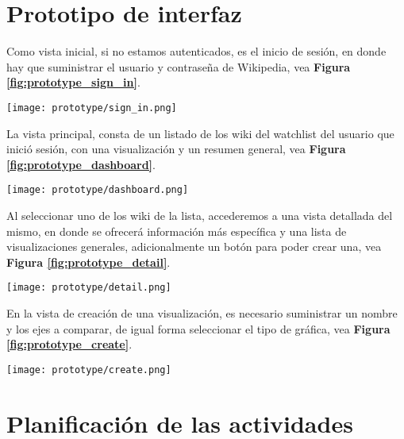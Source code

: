 \section{Prototipo de interfaz}
\bigbreak
Como vista inicial, si no estamos autenticados, es el inicio de sesión, en donde hay que suministrar el usuario y contraseña de Wikipedia, vea \textbf{Figura \ref{fig:prototype_sign_in}}.
\bigbreak
\begin{center}
\texttt{[image: prototype/sign\_in.png]}
\label{fig:prototype_sign_in}
\end{center}
\bigbreak
La vista principal, consta de un listado de los wiki del watchlist del usuario que inició sesión, con una visualización y un resumen general, vea \textbf{Figura \ref{fig:prototype_dashboard}}.
\bigbreak
\begin{center}
\texttt{[image: prototype/dashboard.png]}
\label{fig:prototype_dashboard}
\end{center}
\bigbreak
Al seleccionar uno de los wiki de la lista, accederemos a una vista detallada del mismo, en donde se ofrecerá información más específica y una lista de visualizaciones generales, adicionalmente un botón para poder crear una, vea \textbf{Figura \ref{fig:prototype_detail}}.
\bigbreak
\begin{center}
\texttt{[image: prototype/detail.png]}
\label{fig:prototype_detail}
\end{center}
\bigbreak
En la vista de creación de una visualización, es necesario suministrar un nombre y los ejes a comparar, de igual forma seleccionar el tipo de gráfica, vea \textbf{Figura \ref{fig:prototype_create}}.
\bigbreak
\begin{center}
\texttt{[image: prototype/create.png]}
\label{fig:prototype_create}
\end{center}

\section{Planificación de las actividades}

